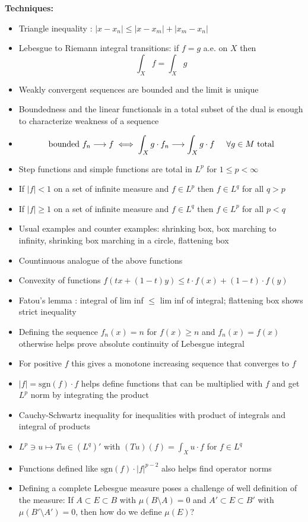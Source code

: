 \documentclass[12pt]{article}
\begin{document}
\newpage
\textbf{Techniques:}
\vspace*{2mm}
\begin{itemize}
    \item Triangle inequality : $|x-x_n|\leq|x-x_m|+|x_m-x_n|$
    \item Lebesgue to Riemann integral transitions: if $f=g$ a.e. on $X$ then
        $$\int_X{f}=\int_X{g}$$
    \item Weakly convergent sequences are bounded and the limit is unique
    \item Boundedness and the linear functionals in a total subset of the dual is enough to characterize weakness of a sequence
    \item $$\text{bounded }f_n\longrightarrow f \iff{\int_X{g\cdot f_n}}\longrightarrow\int_X{g\cdot f}\hspace*{5mm}\forall g\in M \text{ total}$$
    \item Step functions and simple functions are total in $L^p$ for $1\leq p<\infty$
    \item If $|f|<1$ on a set of infinite measure and $f\in L^p$ then $f\in L^q$ for all $q>p$
    \item If $|f|\geq 1$ on a set of infinite measure and $f\in L^q$ then $f\in L^p$ for all $p<q$
    \item Usual examples and counter examples: shrinking box, box marching to infinity, shrinking box marching in a circle, flattening box
    \item Countinuous analogue of the above functions
    \item Convexity of functions $f(tx+(1-t)y)\leq t\cdot f(x)+(1-t)\cdot f(y)$
    \item Fatou's lemma : integral of lim inf $\leq$ lim inf of integral; flattening box shows strict inequality
    \item Defining the sequence $f_n(x)=n$ for $f(x)\geq n$ and $f_n(x)=f(x)$ otherwise helps prove absolute continuity of Lebesgue integral
    \item For positive $f$ this gives a monotone increasing sequence that converges to $f$
    \item $|f|=\text{sgn}(f)\cdot f$ helps define functions that can be multiplied with $f$ and get $L^p$ norm by integrating the product
    \item Cauchy-Schwartz inequality for inequalities with product of integrals and integral of products
    \item $L^p\ni u\mapsto Tu\in (L^q)'$ with $\displaystyle(Tu)(f)=\int_X{u\cdot f}$ for $f\in L^q$
    \item Functions defined like $\text{sgn}(f)\cdot|f|^{p-2}$ also helps find operator norms
    \item Defining a complete Lebesgue measure poses a challenge of well definition of the measure: If $A\subset E\subset B$ with $\mu(B\setminus A)=0$
        and $A'\subset E\subset B'$ with $\mu(B'\setminus A')=0$, then how do we define $\mu(E)$?
\end{itemize}
\end{document}
